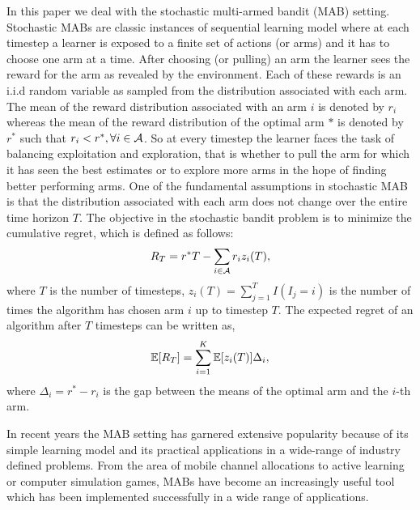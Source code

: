 In this paper we deal with the stochastic multi-armed bandit (MAB) setting. Stochastic MABs are classic instances of sequential learning model where at each timestep a learner is exposed to a finite set of actions (or arms) and it has to choose one arm at a time. After choosing (or pulling) an arm the learner sees the reward for the arm as revealed by the environment. Each of these rewards is an i.i.d random variable as sampled from the distribution associated with each arm. The mean of the reward distribution associated with an arm $i$ is denoted by $r_i$ whereas the mean of the reward distribution of the optimal arm $*$ is denoted by $r^*$ such that $r_i < r^*, \forall i\in \mathcal{A}$. So at every timestep the learner faces the task of balancing exploitation and exploration, that is whether to pull the arm for which it has seen the best estimates or to explore more arms in the hope of finding better performing arms. One of the fundamental assumptions in stochastic MAB is that the distribution associated with each arm does not change over the entire time horizon $T$. The objective in the stochastic bandit problem is to minimize the cumulative regret, which is defined as follows:
\begin{align*}
R_{T}=r^{*}T - \sum_{i\in \mathcal{A}} r_{i}z_{i}(T),
\end{align*}
where $T$ is the number of timesteps, $z_{i}(T)=\sum_{j=1}^T I(I_j=i)$ is the number of times the algorithm has chosen arm $i$ up to timestep $T$.
The expected regret of an algorithm after $T$ timesteps can be written as,
\begin{align*}
\mathbb{E}[R_{T}]= \sum_{i=1}^K \mathbb{E}[z_i (T)] \Delta_i,
\end{align*}
where $\Delta_{i}=r^{*}-r_{i}$ is the gap between the means of the optimal arm and the $i$-th arm.

	In recent years the MAB setting has garnered extensive popularity because of its simple learning  model and its practical applications in a wide-range of industry defined problems. From the area of mobile channel allocations to active learning or computer simulation games, MABs have become an increasingly useful tool which has been implemented successfully in a wide range of applications. 